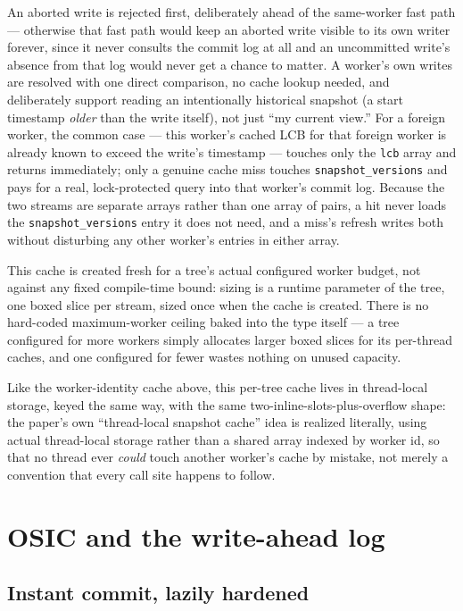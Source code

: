 \documentclass[11pt]{article}
\newcommand{\code}[1]{\texttt{#1}}
\begin{document}
An aborted write is rejected first, deliberately ahead of the same-worker fast path
--- otherwise that fast path would keep an aborted write visible to its own writer
forever, since it never consults the commit log at all and an uncommitted write's
absence from that log would never get a chance to matter. A worker's own writes are
resolved with one direct comparison, no cache lookup needed, and deliberately
support reading an intentionally historical snapshot (a start timestamp \emph{older}
than the write itself), not just ``my current view.'' For a foreign worker, the
common case --- this worker's cached LCB for that foreign worker is already known to
exceed the write's timestamp --- touches only the \code{lcb} array and returns
immediately; only a genuine cache miss touches \code{snapshot\_versions} and pays
for a real, lock-protected query into that worker's commit log. Because the two
streams are separate arrays rather than one array of pairs, a hit never loads the
\code{snapshot\_versions} entry it does not need, and a miss's refresh writes both
without disturbing any other worker's entries in either array.

This cache is created fresh for a tree's actual configured worker budget, not against
any fixed compile-time bound: sizing is a runtime parameter of the tree, one boxed
slice per stream, sized once when the cache is created. There is no hard-coded
maximum-worker ceiling baked into the type itself --- a tree configured for more
workers simply allocates larger boxed slices for its per-thread caches, and one
configured for fewer wastes nothing on unused capacity.

Like the worker-identity cache above, this per-tree cache lives in thread-local
storage, keyed the same way, with the same two-inline-slots-plus-overflow shape:
the paper's own ``thread-local snapshot cache'' idea is realized literally, using
actual thread-local storage rather than a shared array indexed by worker id, so that
no thread ever \emph{could} touch another worker's cache by mistake, not merely a
convention that every call site happens to follow.

\section{OSIC and the write-ahead log}
\label{sec:osic}

\subsection{Instant commit, lazily hardened}
\label{sec:instantcommit}
\end{document}
